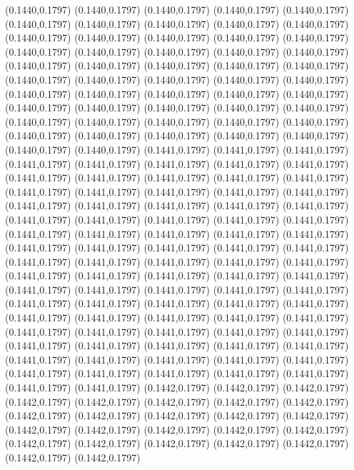 (0.1440,0.1797)
(0.1440,0.1797)
(0.1440,0.1797)
(0.1440,0.1797)
(0.1440,0.1797)
(0.1440,0.1797)
(0.1440,0.1797)
(0.1440,0.1797)
(0.1440,0.1797)
(0.1440,0.1797)
(0.1440,0.1797)
(0.1440,0.1797)
(0.1440,0.1797)
(0.1440,0.1797)
(0.1440,0.1797)
(0.1440,0.1797)
(0.1440,0.1797)
(0.1440,0.1797)
(0.1440,0.1797)
(0.1440,0.1797)
(0.1440,0.1797)
(0.1440,0.1797)
(0.1440,0.1797)
(0.1440,0.1797)
(0.1440,0.1797)
(0.1440,0.1797)
(0.1440,0.1797)
(0.1440,0.1797)
(0.1440,0.1797)
(0.1440,0.1797)
(0.1440,0.1797)
(0.1440,0.1797)
(0.1440,0.1797)
(0.1440,0.1797)
(0.1440,0.1797)
(0.1440,0.1797)
(0.1440,0.1797)
(0.1440,0.1797)
(0.1440,0.1797)
(0.1440,0.1797)
(0.1440,0.1797)
(0.1440,0.1797)
(0.1440,0.1797)
(0.1440,0.1797)
(0.1440,0.1797)
(0.1440,0.1797)
(0.1440,0.1797)
(0.1440,0.1797)
(0.1440,0.1797)
(0.1440,0.1797)
(0.1440,0.1797)
(0.1440,0.1797)
(0.1441,0.1797)
(0.1441,0.1797)
(0.1441,0.1797)
(0.1441,0.1797)
(0.1441,0.1797)
(0.1441,0.1797)
(0.1441,0.1797)
(0.1441,0.1797)
(0.1441,0.1797)
(0.1441,0.1797)
(0.1441,0.1797)
(0.1441,0.1797)
(0.1441,0.1797)
(0.1441,0.1797)
\PST@Solid(0.1441,0.1797)
(0.1441,0.1797)
(0.1441,0.1797)
(0.1441,0.1797)
(0.1441,0.1797)
(0.1441,0.1797)
(0.1441,0.1797)
(0.1441,0.1797)
(0.1441,0.1797)
(0.1441,0.1797)
(0.1441,0.1797)
(0.1441,0.1797)
(0.1441,0.1797)
(0.1441,0.1797)
(0.1441,0.1797)
(0.1441,0.1797)
(0.1441,0.1797)
(0.1441,0.1797)
(0.1441,0.1797)
(0.1441,0.1797)
(0.1441,0.1797)
(0.1441,0.1797)
(0.1441,0.1797)
(0.1441,0.1797)
(0.1441,0.1797)
(0.1441,0.1797)
(0.1441,0.1797)
(0.1441,0.1797)
(0.1441,0.1797)
(0.1441,0.1797)
(0.1441,0.1797)
(0.1441,0.1797)
(0.1441,0.1797)
(0.1441,0.1797)
(0.1441,0.1797)
(0.1441,0.1797)
(0.1441,0.1797)
(0.1441,0.1797)
(0.1441,0.1797)
(0.1441,0.1797)
(0.1441,0.1797)
(0.1441,0.1797)
(0.1441,0.1797)
(0.1441,0.1797)
(0.1441,0.1797)
(0.1441,0.1797)
(0.1441,0.1797)
(0.1441,0.1797)
(0.1441,0.1797)
(0.1441,0.1797)
(0.1441,0.1797)
(0.1441,0.1797)
(0.1441,0.1797)
(0.1441,0.1797)
(0.1441,0.1797)
(0.1441,0.1797)
(0.1441,0.1797)
(0.1441,0.1797)
(0.1441,0.1797)
(0.1441,0.1797)
(0.1441,0.1797)
(0.1441,0.1797)
(0.1441,0.1797)
(0.1441,0.1797)
(0.1441,0.1797)
(0.1441,0.1797)
(0.1441,0.1797)
(0.1441,0.1797)
(0.1441,0.1797)
(0.1441,0.1797)
(0.1441,0.1797)
(0.1442,0.1797)
(0.1442,0.1797)
(0.1442,0.1797)
(0.1442,0.1797)
(0.1442,0.1797)
(0.1442,0.1797)
(0.1442,0.1797)
(0.1442,0.1797)
(0.1442,0.1797)
(0.1442,0.1797)
(0.1442,0.1797)
(0.1442,0.1797)
(0.1442,0.1797)
(0.1442,0.1797)
(0.1442,0.1797)
(0.1442,0.1797)
(0.1442,0.1797)
(0.1442,0.1797)
(0.1442,0.1797)
(0.1442,0.1797)
(0.1442,0.1797)
(0.1442,0.1797)
(0.1442,0.1797)
(0.1442,0.1797)
(0.1442,0.1797)
